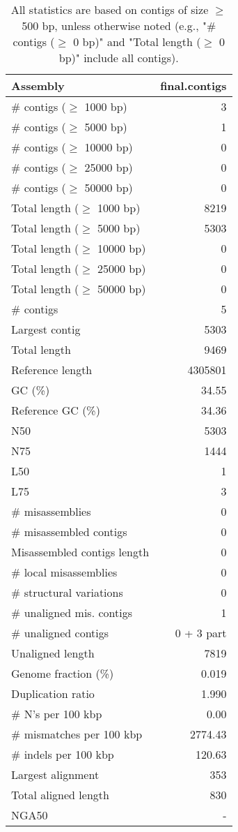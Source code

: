 \documentclass[12pt,a4paper]{article}
\begin{document}
\begin{table}[ht]
\begin{center}
\caption{All statistics are based on contigs of size $\geq$ 500 bp, unless otherwise noted (e.g., "\# contigs ($\geq$ 0 bp)" and "Total length ($\geq$ 0 bp)" include all contigs).}
\begin{tabular}{|l*{1}{|r}|}
\hline
Assembly & final.contigs \\ \hline
\# contigs ($\geq$ 1000 bp) & 3 \\ \hline
\# contigs ($\geq$ 5000 bp) & 1 \\ \hline
\# contigs ($\geq$ 10000 bp) & 0 \\ \hline
\# contigs ($\geq$ 25000 bp) & 0 \\ \hline
\# contigs ($\geq$ 50000 bp) & 0 \\ \hline
Total length ($\geq$ 1000 bp) & 8219 \\ \hline
Total length ($\geq$ 5000 bp) & 5303 \\ \hline
Total length ($\geq$ 10000 bp) & 0 \\ \hline
Total length ($\geq$ 25000 bp) & 0 \\ \hline
Total length ($\geq$ 50000 bp) & 0 \\ \hline
\# contigs & 5 \\ \hline
Largest contig & 5303 \\ \hline
Total length & 9469 \\ \hline
Reference length & 4305801 \\ \hline
GC (\%) & 34.55 \\ \hline
Reference GC (\%) & 34.36 \\ \hline
N50 & 5303 \\ \hline
N75 & 1444 \\ \hline
L50 & 1 \\ \hline
L75 & 3 \\ \hline
\# misassemblies & 0 \\ \hline
\# misassembled contigs & 0 \\ \hline
Misassembled contigs length & 0 \\ \hline
\# local misassemblies & 0 \\ \hline
\# structural variations & 0 \\ \hline
\# unaligned mis. contigs & 1 \\ \hline
\# unaligned contigs & 0 + 3 part \\ \hline
Unaligned length & 7819 \\ \hline
Genome fraction (\%) & 0.019 \\ \hline
Duplication ratio & 1.990 \\ \hline
\# N's per 100 kbp & 0.00 \\ \hline
\# mismatches per 100 kbp & 2774.43 \\ \hline
\# indels per 100 kbp & 120.63 \\ \hline
Largest alignment & 353 \\ \hline
Total aligned length & 830 \\ \hline
NGA50 & - \\ \hline
\end{tabular}
\end{center}
\end{table}
\end{document}
